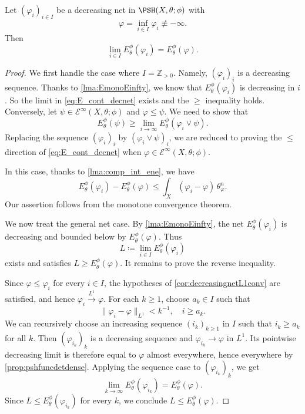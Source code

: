 \begin{proposition}\label{prop:E_cont_decnet}
    Let $(\varphi_i)_{i\in I}$ be a decreasing net in $\PSH(X,\theta;\phi)$ with
    \[
        \varphi=\inf_{i\in I}\varphi_i\not\equiv -\infty.
    \]
    Then
    \begin{equation}\label{eq:E_cont_decnet}
        \lim_{i\in I} E_{\theta}^{\phi}(\varphi_i)=E_{\theta}^{\phi}(\varphi).
    \end{equation}
\end{proposition}
\begin{proof}
    We first handle the case where $I=\mathbb{Z}_{>0}$. Namely, $(\varphi_i)_i$ is a decreasing sequence.
    Thanks to \cref{lma:EmonoEinfty}, we know that $E_{\theta}^{\phi}(\varphi_i)$ is decreasing in $i$. So the limit in \eqref{eq:E_cont_decnet} exists and the $\geq$ inequality holds. Conversely, let $\psi\in \mathcal{E}^{\infty}(X,\theta;\phi)$ and $\varphi\leq \psi$. We need to show that
    \[
    E_{\theta}^{\phi}(\psi)\geq \lim_{i\to\infty} E_{\theta}^{\phi}\left(\varphi_i\lor \psi\right).
    \]
    Replacing the sequence $(\varphi_i)_i$ by $(\varphi_i\lor\psi)_i$, we are reduced to proving the $\leq$ direction of \eqref{eq:E_cont_decnet} when $\varphi\in \mathcal{E}^{\infty}(X,\theta;\phi)$.

    In this case, thanks to \cref{lma:comp_int_ene}, we have
    \[
    E_{\theta}^{\phi}(\varphi_i)-E_{\theta}^{\phi}(\varphi)\leq \int_X (\varphi_i-\varphi)\,\theta_{\varphi}^n.
    \]
    Our assertion follows from the monotone convergence theorem.

    We now treat the general net case. By \cref{lma:EmonoEinfty}, the net $E_{\theta}^{\phi}(\varphi_i)$ is decreasing and bounded below by $E_{\theta}^{\phi}(\varphi)$. Thus
    \[
        L\coloneqq \lim_{i\in I}E_{\theta}^{\phi}(\varphi_i)
    \]
    exists and satisfies $L\geq E_{\theta}^{\phi}(\varphi)$. It remains to prove the reverse inequality.

    Since $\varphi\leq \varphi_i$ for every $i\in I$, the hypotheses of \cref{cor:decreasingnetL1conv} are satisfied, and hence $\varphi_i\xrightarrow{L^1}\varphi$. For each $k\geq 1$, choose $a_k\in I$ such that
    \[
        \|\varphi_i-\varphi\|_{L^1}<k^{-1},\quad i\geq a_k.
    \]
    We can recursively choose an increasing sequence $(i_k)_{k\geq 1}$ in $I$ such that $i_k\geq a_k$ for all $k$. Then $(\varphi_{i_k})_k$ is a decreasing sequence and $\varphi_{i_k}\to\varphi$ in $L^1$. Its pointwise decreasing limit is therefore equal to $\varphi$ almost everywhere, hence everywhere by \cref{prop:pshfuncdetdense}. Applying the sequence case to $(\varphi_{i_k})_k$, we get
    \[
        \lim_{k\to\infty}E_{\theta}^{\phi}(\varphi_{i_k})=E_{\theta}^{\phi}(\varphi).
    \]
    Since $L\leq E_{\theta}^{\phi}(\varphi_{i_k})$ for every $k$, we conclude $L\leq E_{\theta}^{\phi}(\varphi)$.
\end{proof}

